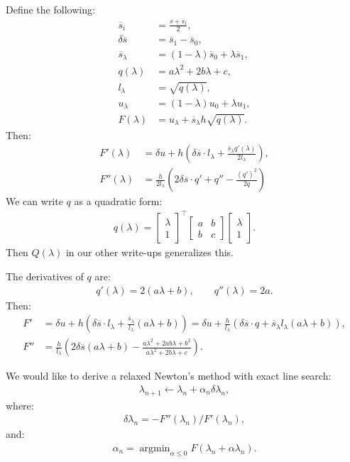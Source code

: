 \documentclass{article}
\newcommand{\parens}[1]{\left(#1\right)}
\newcommand{\sbar}{\overline{s}}
\begin{document}
Define the following:
\begin{align*}
  \sbar_i &= \frac{s + s_i}{2}, \\
  \delta \sbar &= \sbar_1 - \sbar_0, \\
  \sbar_\lambda &= (1 - \lambda)\sbar_0 + \lambda \sbar_1, \\
  q(\lambda) &= a\lambda^2 + 2b\lambda + c, \\
  l_\lambda &= \sqrt{q(\lambda)}, \\
  u_\lambda &= (1 - \lambda)u_0 + \lambda u_1, \\
  F(\lambda) &= u_\lambda + \sbar_\lambda h \sqrt{q(\lambda)}.
\end{align*}
Then:
\begin{align*}
  F'(\lambda) &= \delta u + h\parens{\delta\sbar\cdot{}l_\lambda + \frac{\sbar_\lambda q'(\lambda)}{2 l_\lambda}}, \\
  F''(\lambda) &= \frac{h}{2 l_\lambda} \parens{2 \delta\sbar\cdot{}q' + q'' - \frac{{(q')}^2}{2 q}}
\end{align*}
We can write $q$ as a quadratic form:
\begin{align*}
  q(\lambda) = \begin{bmatrix} \lambda \\ 1 \end{bmatrix}^\top \begin{bmatrix} a & b \\ b & c \end{bmatrix} \begin{bmatrix} \lambda \\ 1 \end{bmatrix}.
\end{align*}
Then $Q(\lambda)$ in our other write-ups generalizes this.

The derivatives of $q$ are:
\begin{align*}
  q'(\lambda) = 2(a\lambda + b), \qquad q''(\lambda) = 2a.
\end{align*}
Then:
\begin{align*}
  F' &= \delta u + h\parens{\delta\sbar\cdot{}l_\lambda + \frac{\sbar_\lambda}{l_\lambda} \parens{a \lambda + b}} = \delta u + \frac{h}{l_\lambda} \parens{\delta\sbar\cdot{}q + \sbar_\lambda l_\lambda (a \lambda + b)}, \\
  F'' &= \frac{h}{l_\lambda} \parens{2 \delta\sbar (a \lambda + b) - \frac{a \lambda^2 + 2ab \lambda + b^2}{a\lambda^2 + 2b \lambda + c}}.
\end{align*}

We would like to derive a relaxed Newton's method with exact line
search:
\begin{align*}
  \lambda_{n+1} \gets \lambda_n + \alpha_n \delta \lambda_n,
\end{align*}
where:
\begin{align*}
  \delta \lambda_n = -F''(\lambda_n)/F'(\lambda_n),
\end{align*}
and:
\begin{align*}
  \alpha_n = \operatorname{argmin}_{\alpha \leq 0} F(\lambda_n + \alpha \lambda_n).
\end{align*}
\end{document}
